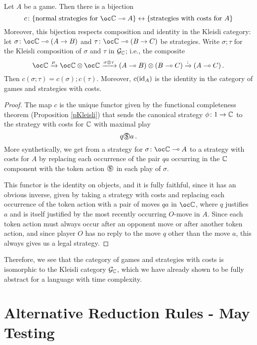 \begin{proposition}
  Let $A$ be a game.  
  Then there is a bijection
  \[
    c \from \{\text{normal strategies for $\oc\bC \implies A$}\}\leftrightarrow\{\text{strategies with costs for $A$}\}
    \]
  Moreover, this bijection respects composition and identity in the Kleisli category: let $\sigma \from\oc\bC \implies (A \to B)$ and $\tau \from \oc\bC \implies (B \to C)$ be strategies.  
  Write $\sigma;\tau$ for the Kleisli composition of $\sigma$ and $\tau$ in $\mathcal G_{\mathbb{C}}$; i.e., the composite
  \[
    \oc\bC \xrightarrow{\mu}
    \oc\bC \tensor \oc\bC \xrightarrow{\sigma\tensor\tau}
    (A \implies B) \tensor (B \implies C) \xrightarrow{;}
    (A \implies C)\,.
    \]
  Then $c(\sigma;\tau)=c(\sigma);c(\tau)$.  
  Moreover, $c(\operatorname{id}_A)$ is the identity in the category of games and strategies with costs.
\end{proposition}
\begin{proof}
  The map $c$ is the unique functor given by the functional completeness theorem (Proposition \ref{pKleisli}) that sends the canonical strategy $\phi \colon 1 \to \mathbb{C}$ to the strategy with costs for $\mathbb{C}$ with maximal play
  \[
    q\slot a\,.
    \]
  More synthetically, we get from a strategy for $\sigma\from\oc \bC \implies A$ to a strategy with costs for $A$ by replacing each occurrence of the pair $qa$ occurring in the $\mathbb{C}$ component with the token action $\slot$ in each play of $\sigma$.

  This functor is the identity on objects, and it is fully faithful, since it has an obvious inverse, given by taking a strategy with costs and replacing each occurrence of the token action with a pair of moves $qa$ in $\oc\bC$, where $q$ justifies $a$ and is itself justified by the most recently occurring $O$-move in $A$.
  Since each token action must always occur after an opponent move or after another token action, and since player $O$ has no reply to the move $q$ other than the move $a$, this always gives us a legal strategy.
\end{proof}

Therefore, we see that the category of games and strategies with costs is isomorphic to the Kleisli category $\mathcal G_{\mathbb{C}}$, which we have already shown to be fully abstract for a language with time complexity.

\section{Alternative Reduction Rules - May Testing}
\label{SecMayTesting}

